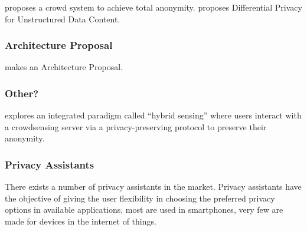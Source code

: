 \documentclass[conference]{IEEEtran}
\begin{document}
\cite{SunSecure} proposes a crowd system to achieve total anonymity.
\cite{ZhaoSurvey} proposes Differential Privacy for Unstructured Data Content.

\subsubsection{Architecture Proposal}

\cite{AntunesFederated} makes an Architecture Proposal.

\subsubsection{Other?}

\cite{ZhuIntegrating} explores an integrated paradigm called ``hybrid sensing'' where users interact with a crowdsensing server via a privacy-preserving protocol to preserve their anonymity.

\subsubsection{Privacy Assistants}

There exists a number of privacy assistants in the market. Privacy assistants
have the objective of giving the user flexibility in choosing the
preferred privacy options in available applications, most are used in
smartphones, very few are made for devices in the internet of things.
\end{document}
